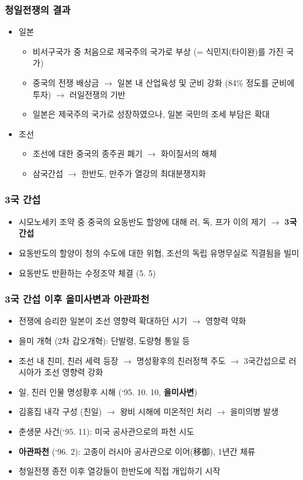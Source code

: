 \subsubsection*{청일전쟁의 결과}
\begin{itemize}
\item 일본
\begin{itemize}
    \item 비서구국가 중 처음으로 제국주의 국가로 부상 (= 식민지(타이완)를 가진 국가)
    \item 중국의 전쟁 배상금 $\rightarrow$ 일본 내 산업육성 및 군비 강화 (84\% 정도를 군비에 투자) $\rightarrow$ 러일전쟁의 기반
    \item 일본은 제국주의 국가로 성장하였으나, 일본 국민의 조세 부담은 확대
\end{itemize}
\item 조선
    \begin{itemize}
    \item 조선에 대한 중국의 종주권 폐기 $\rightarrow$ 화이질서의 해체
    \item 삼국간섭 $\rightarrow$ 한반도, 만주가 열강의 최대분쟁지화
    \end{itemize}
\end{itemize}

\subsubsection*{3국 간섭}
\begin{itemize}
    \item 시모노세키 조약 중 중국의 요동반도 할양에 대해 러, 독, 프가 이의 제기 $\rightarrow$ \textbf{3국 간섭}
    \item 요동반도의 할양이 청의 수도에 대한 위협, 조선의 독립 유명무실로 직결됨을 빌미
    \item 요동반도 반환하는 수정조약 체결 (5. 5)
\end{itemize}
\pagebreak

\subsubsection*{3국 간섭 이후 을미사변과 아관파천}
\begin{itemize}
    \item 전쟁에 승리한 일본이 조선 영향력 확대하던 시기 $\rightarrow$ 영향력 약화
    \item 을미 개혁 (2차 갑오개혁): 단발령, 도량형 통일 등
    \item 조선 내 친미, 친러 세력 등장 $\rightarrow$ 명성황후의 친러정책 주도 $\rightarrow$ 3국간섭으로 러시아가 조선 영향력 강화
    \item 일, 친러 인물 명성황후 시해 (`95. 10. 10, \textbf{을미사변})
    \item 김홍집 내각 구성 (친일) $\rightarrow$ 왕비 시해에 미온적인 처리 $\rightarrow$ 을미의병 발생
    \item 춘생문 사건(`95. 11): 미국 공사관으로의 파천 시도
    \item \textbf{아관파천} (`96. 2): 고종이 러시아 공사관으로 이어(移御), 1년간 체류
    \item 청일전쟁 종전 이후 열강들이 한반도에 직접 개입하기 시작
\end{itemize}
